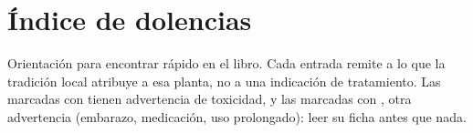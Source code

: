 \documentclass[11pt,twoside,openright]{book}
\newcommand{\cierre}{%
  \par\FloatBarrier
  \ifdim\pagetotal=0pt\relax\else
  \ifdim\dimexpr\pagegoal-\pagetotal\relax<5\baselineskip\relax\else
  \vspace{1.6em}
  \begin{center}\color{verdehoja}\pgfornament[width=2.6cm]{88}\end{center}
  \vspace{0.4em}\fi\fi}
\begin{document}
\cierre

\makeatletter\@openrightfalse\makeatother
\backmatter

\chapter*{Índice de dolencias}

\noindent\small Orientación para encontrar rápido en el libro. Cada
entrada remite a lo que la tradición local atribuye a esa planta, no a
una indicación de tratamiento. Las marcadas con \textdagger{} tienen
advertencia de toxicidad, y las marcadas con \textdaggerdbl{}, otra
advertencia (embarazo, medicación, uso prolongado): leer su ficha antes
que nada.
\end{document}
